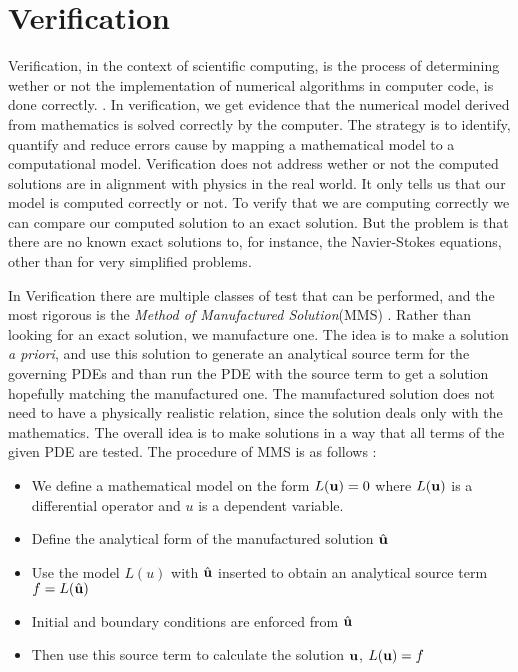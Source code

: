 \section{Verification}
Verification, in the context of scientific computing, is the process of determining wether or not the implementation of numerical algorithms in computer code, is done correctly. \cite{Oberkampf2010}. 
In verification, we get evidence that the numerical model derived from mathematics is solved correctly by the computer. The strategy is to identify, quantify and reduce errors cause by mapping a mathematical model to a computational model. Verification does not address wether or not the computed solutions are in alignment with physics in the real world. It only tells us that our model is computed correctly or not. To verify that we are computing correctly we can compare our computed solution to an exact solution. But the problem is that there are no known exact solutions to, for instance, the Navier-Stokes equations, other than for very simplified problems. \newline

In Verification there are multiple classes of test that can be performed, and the most rigorous is the \textit{Method of Manufactured Solution}(MMS) \cite{Oberkampf2010}. Rather than looking for an exact solution, we manufacture one. The idea is to make a solution \textit{a priori},  and use this solution to generate an analytical source term for the governing PDEs and than run the PDE with the source term to get a solution hopefully matching the manufactured one. The manufactured solution does not need to have a physically realistic relation, since the solution deals only with the mathematics. The overall idea is to make solutions in a way that all terms of the given PDE are tested.
The procedure of MMS is as follows \cite{Oberkampf2010}:
\begin{itemize}
\item We define a mathematical model on the form $ L(\bold{u}) = 0$ where $L(\bold{u})$ is a differential operator and $u$ is a dependent variable.
\item Define the analytical form of the manufactured solution $\hat{\bold{u}}$
\item Use the model $L(u)$ with $\hat{\bold{u}}$ inserted to obtain an analytical source term $ f = L(\hat{\bold{u}}) $
\item Initial and boundary conditions are enforced from $\hat{\bold{u}}$
\item Then use this source term to calculate the solution $\bold{u}$, $L(\bold{u}) = f $
\end{itemize}


